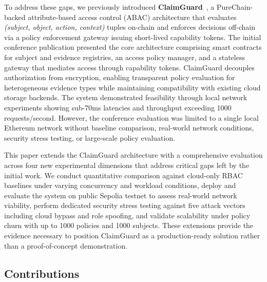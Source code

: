 \documentclass[final,5p,times,twocolumn]{elsarticle}
\begin{document}
To address these gaps, we previously introduced \textbf{ClaimGuard}~\cite{eneh2025claimguard}, a PureChain-backed attribute-based access control (ABAC) architecture that evaluates \emph{(subject, object, action, context)} tuples on-chain and enforces decisions off-chain via a policy enforcement gateway issuing short-lived capability tokens. The initial conference publication presented the core architecture comprising smart contracts for subject and evidence registries, an access policy manager, and a stateless gateway that mediates access through capability tokens. ClaimGuard decouples authorization from encryption, enabling transparent policy evaluation for heterogeneous evidence types while maintaining compatibility with existing cloud storage backends. The system demonstrated feasibility through local network experiments showing sub-70ms latencies and throughput exceeding 1000 requests/second. However, the conference evaluation was limited to a single local Ethereum network without baseline comparison, real-world network conditions, security stress testing, or large-scale policy evaluation.

This paper extends the ClaimGuard architecture with a comprehensive evaluation across four new experimental dimensions that address critical gaps left by the initial work. We conduct quantitative comparison against cloud-only RBAC baselines under varying concurrency and workload conditions, deploy and evaluate the system on public Sepolia testnet to assess real-world network viability, perform dedicated security stress testing against five attack vectors including cloud bypass and role spoofing, and validate scalability under policy churn with up to 1000 policies and 1000 subjects. These extensions provide the evidence necessary to position ClaimGuard as a production-ready solution rather than a proof-of-concept demonstration.

\subsection{Contributions}
\end{document}
